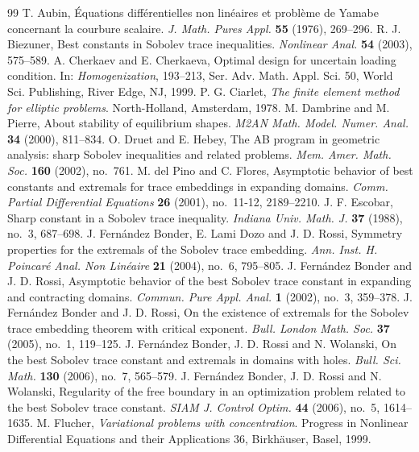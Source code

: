 \documentclass[11pt]{amsart}
\theoremstyle{remark}
\numberwithin{equation}{section}
\begin{document}
\begin{thebibliography}{99}
 T. Aubin, Équations différentielles non linéaires et problème de Yamabe concernant la courbure scalaire. \emph{J. Math. Pures Appl.} \textbf{55} (1976), 269--296.
 R. J. Biezuner, Best constants in Sobolev trace inequalities. \emph{Nonlinear Anal.} \textbf{54} (2003), 575--589.
 A. Cherkaev and E. Cherkaeva, Optimal design for uncertain loading condition. In: \emph{Homogenization}, 193--213, Ser. Adv. Math. Appl. Sci. 50, World Sci. Publishing, River Edge, NJ, 1999.
 P. G. Ciarlet, \emph{The finite element method for elliptic problems}. North-Holland, Amsterdam, 1978.
 M. Dambrine and M. Pierre, About stability of equilibrium shapes. \emph{M2AN Math. Model. Numer. Anal.} \textbf{34} (2000), 811--834.
 O. Druet and E. Hebey, The AB program in geometric analysis: sharp Sobolev inequalities and related problems. \emph{Mem. Amer. Math. Soc.} \textbf{160} (2002), no.~761.
 M. del Pino and C. Flores, Asymptotic behavior of best constants and extremals for trace embeddings in expanding domains. \emph{Comm. Partial Differential Equations} \textbf{26} (2001), no.~11-12, 2189--2210.
 J. F. Escobar, Sharp constant in a Sobolev trace inequality. \emph{Indiana Univ. Math. J.} \textbf{37} (1988), no.~3, 687--698.
 J. Fernández Bonder, E. Lami Dozo and J. D. Rossi, Symmetry properties for the extremals of the Sobolev trace embedding. \emph{Ann. Inst. H. Poincaré Anal. Non Linéaire} \textbf{21} (2004), no.~6, 795--805.
 J. Fernández Bonder and J. D. Rossi, Asymptotic behavior of the best Sobolev trace constant in expanding and contracting domains. \emph{Commun. Pure Appl. Anal.} \textbf{1} (2002), no.~3, 359--378.
 J. Fernández Bonder and J. D. Rossi, On the existence of extremals for the Sobolev trace embedding theorem with critical exponent. \emph{Bull. London Math. Soc.} \textbf{37} (2005), no.~1, 119--125.
 J. Fernández Bonder, J. D. Rossi and N. Wolanski, On the best Sobolev trace constant and extremals in domains with holes. \emph{Bull. Sci. Math.} \textbf{130} (2006), no.~7, 565--579.
 J. Fernández Bonder, J. D. Rossi and N. Wolanski, Regularity of the free boundary in an optimization problem related to the best Sobolev trace constant. \emph{SIAM J. Control Optim.} \textbf{44} (2006), no.~5, 1614--1635.
 M. Flucher, \emph{Variational problems with concentration}. Progress in Nonlinear Differential Equations and their Applications 36, Birkhäuser, Basel, 1999.

\end{thebibliography}
\end{document}
